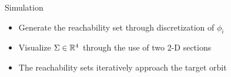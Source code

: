 \documentclass[11pt,professionalfonts]{beamer}
\begin{document}
\begin{frame}{Simulation}
\begin{itemize}
    \item<1> Generate the reachability set through discretization of \( \phi_i \)
    \item<1> Visualize \( \Sigma \in \mathbb{R}^4 \) through the use of two 2-D sections
    \item<2> The reachability sets iteratively approach the target orbit
\end{itemize}


\end{frame}
\end{document}
